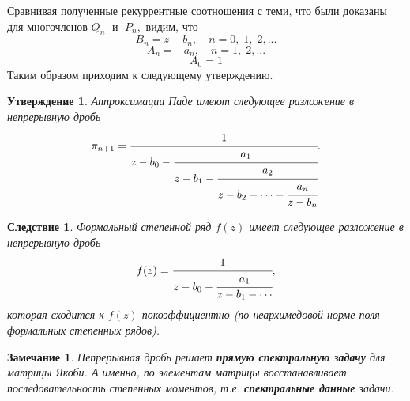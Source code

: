 \documentclass[12 pt, a4 paper]{article}
\theoremstyle{plain}   \newtheorem{Pro}{Задача}
\newtheorem{Sta}{Утверждение}
\newtheorem{Rem}{Замечание}
\newtheorem{Cor}{Следствие}
\begin{document}
Сравнивая полученные рекуррентные соотношения с теми,
что были доказаны для многочленов
$ Q_n \; $
и
$ \; P_n ,$
видим, что
$$
  B_n =z-b_n , \quad n=0, \; 1, \; 2,...
$$
$$
  A_n =-a_n , \quad n=1, \; 2, ...
$$
$$
  A_0 =1
$$
Таким образом приходим к следующему утверждению.
\begin{Sta}
Аппроксимации Паде имеют следующее разложение в непрерывную дробь
\begin{equation*}
  \pi _{n+1} =
   \cfrac{1}{z-b_0 -
    \cfrac{a_1 }{z-b_1 -
	 \cfrac{a_2}{z-b_2 - \dotsb -
	  \cfrac{a_n}{z-b_n }}}}.
\end{equation*}
\end{Sta}
\begin{Cor}
Формальный степенной ряд
$ f(z) $
имеет следующее разложение в непрерывную дробь
\begin{equation*}
  f(z)=
    \cfrac{1}{z-b_0 -
	 \cfrac{a_1 }{z-b_1 - \dotsb }},
\end{equation*}
которая сходится к
$ f(z) $
покоэффициентно (по неархимедовой норме поля формальных
степенных рядов).
\end{Cor}
\begin{Rem}
Непрерывная дробь решает
{\bfseries прямую спектральную задачу}
для матрицы Якоби. А именно, по элементам матрицы
восстанавливает последовательность степенных моментов, т.е.
{\bfseries спектральные данные}
задачи.
\end{Rem}
$ \; $
\\
\end{document}
